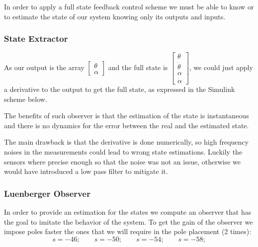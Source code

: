             In order to apply a full state feedback control scheme we must be able to know or to estimate the state of our system knowing only its outputs and inputs.

            \subsubsection{State Extractor}

                As our output is the array 
                $\begin{bmatrix}
                    \theta \\
                    \alpha
                \end{bmatrix}$
                and the full state is 
                $\begin{bmatrix}
                    \theta \\
                    \dot\theta \\
                    \alpha \\
                    \dot\alpha 
                \end{bmatrix}$,
                we could just apply a derivative to the output to get the full state, as expressed in the Simulink scheme below.


                The benefits of such observer is that the estimation of the state is instantaneous and there is no dynamics for the error between the real and the estimated state.

                The main drawback is that the derivative is done numerically, so high frequency noises in the measurements could lead to wrong state estimations.
                Luckily the sensors where precise enough so that the noise was not an issue, otherwise we would have introduced a low pass filter to mitigate it.


            \subsubsection{Luenberger Observer}

                In order to provide an estimation for the states we compute an observer that has the goal to imitate the behavior of the system. To get the gain of the observer we impose poles faster \wrt the ones that we will require in the pole placement (2 times):
                \[
                    s = -46; \qquad s = -50; \qquad s=-54; \qquad s=-58;\]

